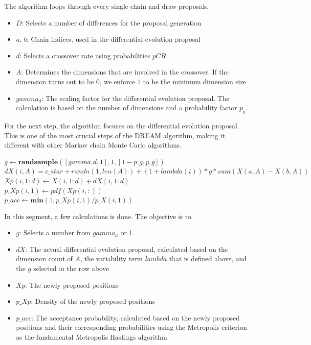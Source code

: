 The algorithm loops through every single chain and draw proposals.
\begin{itemize}
    \item $D$: Selects a number of differences for the proposal generation
    \item $a$, $b$: Chain indices, used in the differential evolution proposal
    \item $d$: Selects a crossover rate using probabilities $pCR$
    \item $A$: Determines the dimensions that are involved in the crossover. If the dimension turns out to be $0$, we enforce $1$ to be the minimum dimension size
    \item $gamma_d$: The scaling factor for the differential evolution proposal. The calculation is based on the number of dimensions and a probability factor $p_g$.
\end{itemize}

For the next step, the algorithm focuses on the differential evolution proposal. This is one of the most crucial steps of the DREAM algorithm, making it different with other Markov chain Monte Carlo algorithms.

\begin{algorithm}[H]
$g \gets \textbf{randsample}([gamma\_d, 1], 1, [1-p\_g, p\_g])$\\
$dX(i, A) = c\_star + randn(1, len(A)) + (1 + lambda(i)) * g * sum(X(a, A) - X(b, A))$\\
$Xp(i, 1:d) \gets X(i, 1:d) + dX(i, 1:d)$\\
$p\_Xp(i, 1) \gets pdf(Xp(i, :))$\\
$p\_acc \gets \textbf{min}(1, p\_Xp(i, 1) / p\_X(i, 1))$
\end{algorithm}

In this segment, a few calculations is done. The objective is to.
\begin{itemize}
    \item $g$: Selects a number from $gamma_d$ or 1
    \item $dX$: The actual differential evolution proposal, calculated based on the dimension count of $A$, the variability term $lambda$ that is defined above, and the $g$ selected in the row above
    \item $Xp$: The newly proposed positions
    \item $p\_Xp$: Density of the newly proposed positions
    \item $p\_acc$: The acceptance probability, calculated based on the newly proposed positions and their corresponding probabilities using the Metropolis criterion as the fundamental Metropolis Hastings algorithm
\end{itemize}

